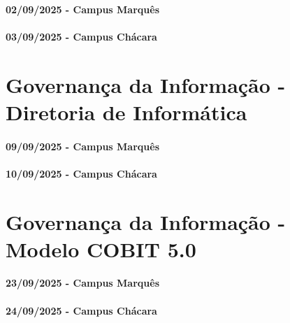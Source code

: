 \documentclass[
]{book}
\begin{document}
\subsubsection*{02/09/2025 - Campus Marquês}\label{campus-marquuxeas-4}

\subsubsection*{03/09/2025 - Campus Chácara}\label{campus-chuxe1cara-4}

\chapter{Governança da Informação - Diretoria de Informática}\label{governanuxe7a-da-informauxe7uxe3o---diretoria-de-informuxe1tica}

\subsubsection*{09/09/2025 - Campus Marquês}\label{campus-marquuxeas-5}

\subsubsection*{10/09/2025 - Campus Chácara}\label{campus-chuxe1cara-5}

\chapter{Governança da Informação - Modelo COBIT 5.0}\label{governanuxe7a-da-informauxe7uxe3o---modelo-cobit-5.0}

\subsubsection*{23/09/2025 - Campus Marquês}\label{campus-marquuxeas-6}

\subsubsection*{24/09/2025 - Campus Chácara}\label{campus-chuxe1cara-6}
\end{document}
